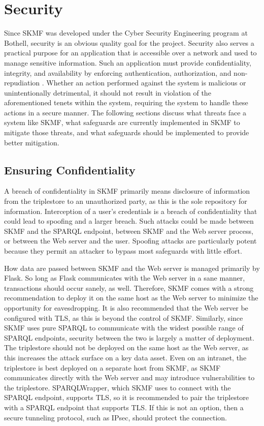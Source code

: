 \section{Security}
\label{result:security}

Since SKMF was developed under the Cyber Security Engineering program at Bothell, security is an obvious quality goal for the project. Security also serves a practical purpose for an application that is accessible over a network and used to manage sensitive information. Such an application must provide confidentiality, integrity, and availability by enforcing authentication, authorization, and non-repudiation
\cite{incidentresponse}.
Whether an action performed against the system is malicious or unintentionally detrimental, it should not result in violation of the aforementioned tenets within the system, requiring the system to handle these actions in a secure manner. The following sections discuss what threats face a system like SKMF, what safeguards are currently implemented in SKMF to mitigate those threats, and what safeguards should be implemented to provide better mitigation.


\subsection{Ensuring Confidentiality}
\label{result:confidentiality}

A breach of confidentiality in SKMF primarily means disclosure of information from the triplestore to an unauthorized party, as this is the sole repository for information. Interception of a user's credentials is a breach of confidentiality that could lead to spoofing and a larger breach. Such attacks could be made between SKMF and the SPARQL endpoint, between SKMF and the Web server process, or between the Web server and the user. Spoofing attacks are particularly potent because they permit an attacker to bypass most safeguards with little effort.

How data are passed between SKMF and the Web server is managed primarily by Flask. So long as Flask communicates with the Web server in a sane manner, transactions should occur sanely, as well. Therefore, SKMF comes with a strong recommendation to deploy it on the same host as the Web server to minimize the opportunity for eavesdropping. It is also recommended that the Web server be configured with TLS, as this is beyond the control of SKMF. Similarly, since SKMF uses pure SPARQL to communicate with the widest possible range of SPARQL endpoints, security between the two is largely a matter of deployment. The triplestore should not be deployed on the same host as the Web server, as this increases the attack surface on a key data asset. Even on an intranet, the triplestore is best deployed on a separate host from SKMF, as SKMF communicates directly with the Web server and may introduce vulnerabilities to the triplestore. SPARQLWrapper, which SKMF uses to connect with the SPARQL endpoint, supports TLS, so it is recommended to pair the triplestore with a SPARQL endpoint that supports TLS. If this is not an option, then a secure tunneling protocol, such as IPsec, should protect the connection.

